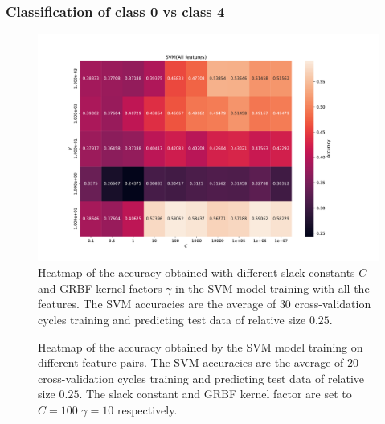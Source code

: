 \subsubsection{Classification of class 0 vs class 4}

\begin{figure}[H]
\centering
\includegraphics[width=1\textwidth]{Figures/accuracy(C,gamma)1}
\caption{Heatmap of the accuracy obtained with different slack constants $C$ and 
GRBF kernel factors $\gamma $ in the SVM model training with all the features. The SVM accuracies are the average of $30$ cross-validation 
cycles training and predicting test data of relative size $0.25$.}
\label{fig:Figures-accuracy-C-gamma-1}
\end{figure}

\begin{figure}[H]
\centering
{}
\caption{Heatmap of the accuracy obtained by the SVM model training on different feature pairs. The SVM accuracies are the average 
of $20$ cross-validation cycles training and predicting test data of relative size $0.25$.
The slack constant and GRBF kernel factor are set to $C=100$  $\gamma=10 $ respectively. }
\label{fig:Figures-feature_pairs1}
\end{figure}

